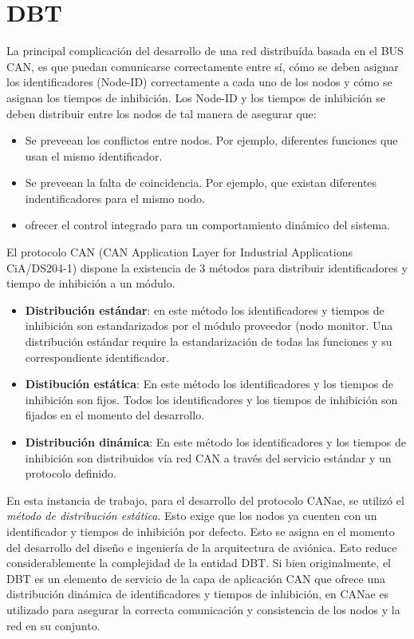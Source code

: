 \section{DBT}\label{Appendix:DBT}
La principal complicación del desarrollo de una red distribuída basada en el BUS
CAN, es que puedan comunicarse correctamente entre sí, cómo se deben asignar
los identificadores (Node-ID) correctamente a cada uno de los nodos y cómo se
asignan los tiempos de inhibición. Los Node-ID y los tiempos de inhibición se
deben distribuir entre los nodos de tal manera de asegurar que:
\begin{itemize}
\item Se preveean los conflictos entre nodos. Por ejemplo, diferentes funciones
  que usan el mismo identificador.
\item Se preveean la falta de coincidencia. Por ejemplo, que existan diferentes
  indentificadores para el mismo nodo.
\item ofrecer el control integrado para un comportamiento dinámico del
  sistema.  
\end{itemize}

El protocolo CAN (CAN Application Layer for Industrial Applications
CiA/DS204-1) dispone la existencia de 3 métodos para distribuir identificadores
y tiempo de inhibición a un módulo.

\begin{itemize}
\item \textbf{Distribución estándar}: en este método los identificadores y
  tiempos de inhibición son estandarizados por el módulo proveedor (nodo
  monitor. Una distribución estándar require la estandarización de todas las
  funciones y su correspondiente identificador.
\item \textbf{Distibución estática}: En este método los identificadores y los
  tiempos de inhibición son fijos. Todos los identificadores y los tiempos de
  inhibición son fijados en el momento del desarrollo.
\item \textbf{Distribución dinámica}: En este método los identificadores y los
  tiempos de inhibición son distribuidos vía red CAN a través del servicio
  estándar y un protocolo definido.  
\end{itemize}

En esta instancia de trabajo, para el desarrollo del protocolo CANae, se utilizó
el \textit{método de distribución estática}. Esto exige que los nodos ya cuenten
con un identificador y tiempos de inhibición por defecto. Esto se asigna en el
momento del desarrollo del diseño e ingeniería de la arquitectura de aviónica.
Esto reduce considerablemente la complejidad de la entidad DBT. Si bien
originalmente, el DBT es un elemento de servicio de la capa de aplicación CAN
que ofrece una distribución dinámica de identificadores y tiempos de inhibición,
en CANae es utilizado para asegurar la correcta comunicación y consistencia de
los nodos y la red en su conjunto.

